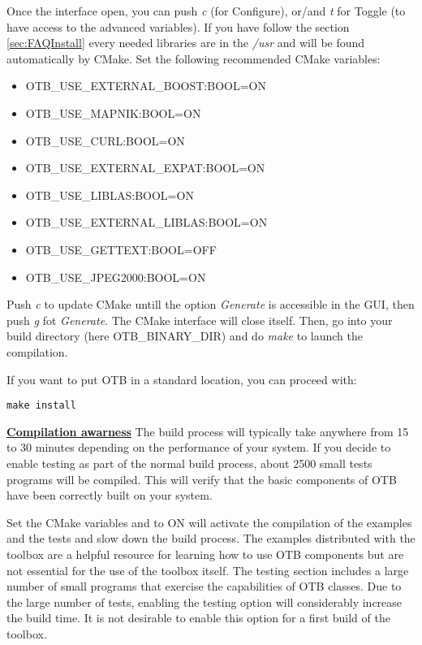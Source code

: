 Once the interface open, you can push \emph{c} (for Configure), or/and \emph{t} for Toggle (to have access to the advanced variables). If you have follow the section \ref{sec:FAQInstall} every needed libraries are in the
\emph{/usr} and will be found automatically by CMake. Set the following recommended CMake variables:
\begin{itemize}
\item OTB\_USE\_EXTERNAL\_BOOST:BOOL=ON
\item OTB\_USE\_MAPNIK:BOOL=ON
\item OTB\_USE\_CURL:BOOL=ON
\item OTB\_USE\_EXTERNAL\_EXPAT:BOOL=ON
\item OTB\_USE\_LIBLAS:BOOL=ON
\item OTB\_USE\_EXTERNAL\_LIBLAS:BOOL=ON
\item OTB\_USE\_GETTEXT:BOOL=OFF
\item OTB\_USE\_JPEG2000:BOOL=ON
\end{itemize}

Push \emph{c} to update CMake untill the option \emph{Generate} is accessible in the GUI,
then push \emph{g} fot \emph{Generate}. The CMake interface will close itself.
Then, go into your build directory (here OTB\_BINARY\_DIR) and do \emph{make} to launch the compilation.

If you want to put OTB in a standard location, you can proceed with:

\begin{verbatim}
make install
\end{verbatim}

\textbf{\underline{Compilation awarness}}
The build process will typically take anywhere from 15 to 30 minutes depending
on the performance of your system. If you decide to enable testing as part of
the normal build process, about 2500 small tests programs will be compiled. This
will verify that the basic components of OTB have been correctly built on your
system.

Set the CMake variables  and  to ON will activate 
the compilation of the examples and the tests and slow down the build process.
The examples distributed with the toolbox are a helpful resource for learning how to use OTB
components but are not essential for the use of the toolbox itself. The testing
section includes a large number of small programs that exercise the
capabilities of OTB classes. Due to the large number of tests, enabling the
testing option will considerably increase the build time.  It is not
desirable to enable this option for a first build of the toolbox.

